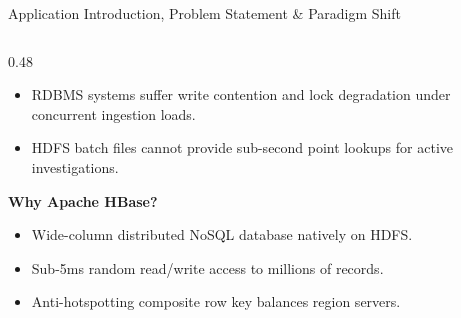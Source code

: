 \documentclass[aspectratio=169]{beamer}
\begin{document}
\begin{frame}{Application Introduction, Problem Statement \& Paradigm Shift}
\begin{columns}[T]
\begin{column}{0.48\textwidth}
\begin{itemize}
                \item RDBMS systems suffer write contention and lock degradation under concurrent ingestion loads.
                \item HDFS batch files cannot provide sub-second point lookups for active investigations.
            \end{itemize}
            \vspace{0.06cm}
            \textbf{\textcolor{AmritaMaroon}{Why Apache HBase?}}
            \begin{itemize}\footnotesize
                \setlength{\itemsep}{1pt}
                \item Wide-column distributed NoSQL database natively on HDFS.
                \item Sub-5ms random read/write access to millions of records.
                \item Anti-hotspotting composite row key balances region servers.
            \end{itemize}
        \end{column}
    \end{columns}
\end{frame}
\end{document}
